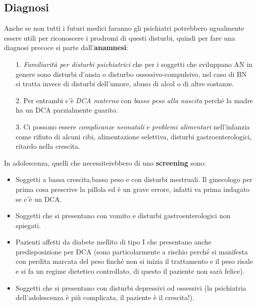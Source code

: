 \subsection{Diagnosi}

Anche se non tutti i futuri medici faranno gli psichiatri potrebbero
ugualmente essere utili per riconoscere i prodromi di questi disturbi,
quindi per fare una diagnosi precoce si parte dall'\textbf{anamnesi}:

\begin{itemize}
\item[1.]
  \emph{Familiarità per disturbi psichiatrici} che per i soggetti che
  sviluppano AN in genere sono disturbi d'ansia o disturbo
  ossessivo-compulsivo, nel caso di BN si tratta invece di disturbi
  dell'umore, abuso di alcol o di altre sostanze.
\item[2.]
  Per entrambi c'è \emph{DCA materno} con \emph{basso peso alla nascita}
  perché la madre ha un DCA parzialmente guarito.
\item[3.]
  Ci possono essere \emph{complicanze neonatali} e \emph{problemi
  alimentari} nell'infanzia come rifiuto di alcuni cibi, alimentazione
  selettiva, disturbi gastroenterologici, ritardo nella crescita.
\end{itemize}

In adolescenza, quelli che necessiterebbero di uno \textbf{screening}
sono:

\begin{itemize}
\item
  Soggetti a bassa crescita,basso peso e con disturbi mestruali. Il
  ginecologo per prima cosa prescrive la pillola ed è un grave errore,
  infatti va prima indagato se c'è un DCA.
\item
  Soggetti che si presentano con vomito e disturbi gastroenterologici
  non spiegati.
\item
  Pazienti affetti da diabete mellito di tipo I che presentano anche
  predisposizione per DCA (sono particolarmente a rischio perché si
  manifesta con perdita marcata del peso finché non si inizia il
  trattamento e il peso risale e si fa un regime dietetico controllato,
  di questo il paziente non sarà felice).
\item
  Soggetti che si presentano con disturbi depressivi od ossessivi (la
  psichiatria dell'adolescenza è più complicata, il paziente è il
  crescita!).
\end{itemize}

